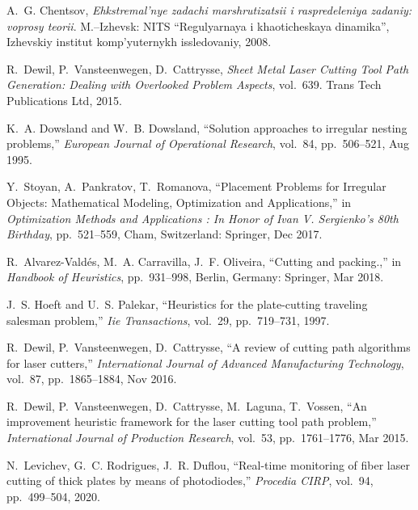   \item
  A.~G. Chentsov, {\em Ehkstremal'nye zadachi marshrutizatsii i raspredeleniya
    zadaniy: voprosy teorii}.
  \newblock M.--Izhevsk: NITS ``Regulyarnaya i khaoticheskaya dinamika'',
    Izhevskiy institut komp'yuternykh issledovaniy, 2008.

  \item
  R.~Dewil, P.~Vansteenwegen, D.~Cattrysse, {\em {Sheet Metal Laser Cutting
    Tool Path Generation: Dealing with Overlooked Problem Aspects}}, vol.~639.
  \newblock Trans Tech Publications Ltd, 2015.

  \item
  K.~A. Dowsland and W.~B. Dowsland, ``{Solution approaches to irregular nesting
    problems},'' {\em European Journal of Operational Research}, vol.~84,
    pp.~506--521, Aug 1995.

  \item
  Y.~Stoyan, A.~Pankratov, T.~Romanova, ``{Placement Problems for Irregular
    Objects: Mathematical Modeling, Optimization and Applications},'' in {\em
    {Optimization Methods and Applications : In Honor of Ivan V. Sergienko's 80th
    Birthday}}, pp.~521--559, Cham, Switzerland: Springer, Dec 2017.

  \item
  R.~Alvarez-Vald{\'e}s, M.~A. Carravilla, J.~F. Oliveira, ``Cutting and
    packing.,'' in {\em {Handbook of Heuristics}}, pp.~931--998, Berlin, Germany:
    Springer, Mar 2018.

  \item
  J.~S. Hoeft and U.~S. Palekar, ``Heuristics for the plate-cutting traveling
    salesman problem,'' {\em Iie Transactions}, vol.~29, pp.~719--731, 1997.

  \item
  R.~Dewil, P.~Vansteenwegen, D.~Cattrysse, ``{A review of cutting path
    algorithms for laser cutters},'' {\em International Journal of Advanced
    Manufacturing Technology}, vol.~87, pp.~1865--1884, Nov 2016.

  \item
  R.~Dewil, P.~Vansteenwegen, D.~Cattrysse, M.~Laguna, T.~Vossen, ``{An
    improvement heuristic framework for the laser cutting tool path problem},''
    {\em International Journal of Production Research}, vol.~53, pp.~1761--1776,
    Mar 2015.

  \item
  N.~Levichev, G.~C. Rodrigues, J.~R. Duflou, ``Real-time monitoring of fiber
    laser cutting of thick plates by means of photodiodes,'' {\em Procedia CIRP},
    vol.~94, pp.~499--504, 2020.


